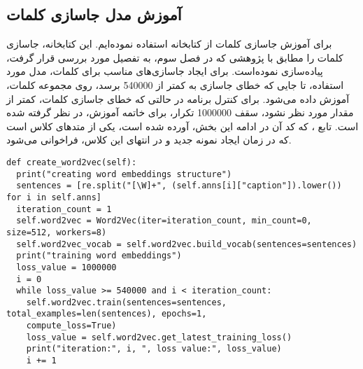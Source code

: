 \subsection*{آموزش مدل جاسازی کلمات}
برای آموزش جاسازی کلمات از کتابخانه  استفاده نموده‌ایم. این کتابخانه، جاسازی کلمات را مطابق با پژوهشی که در فصل سوم، به تفصیل مورد بررسی قرار گرفت، پیاده‌سازی نموده‌است. برای ایجاد جاسازی‌های مناسب برای کلمات، مدل مورد استفاده، تا جایی که خطای جاسازی به کمتر از 540000 برسد، روی مجموعه کلمات، آموزش داده می‌شود. برای کنترل برنامه در حالتی که خطای جاسازی کلمات، کمتر از مقدار مورد نظر نشود، سقف 1000000 تکرار، برای خاتمه آموزش، در نظر گرفته شده است. تابع ، که کد آن در ادامه این بخش، آورده شده است، یکی از متدهای کلاس  است که در زمان ایجاد نمونه جدید و در انتهای  این کلاس، فراخوانی می‌شود.
\begin{latin}
\begin{verbatim}
def create_word2vec(self):
  print("creating word embeddings structure")
  sentences = [re.split("[\W]+", (self.anns[i]["caption"]).lower()) for i in self.anns]
  iteration_count = 1
  self.word2vec = Word2Vec(iter=iteration_count, min_count=0, size=512, workers=8)
  self.word2vec_vocab = self.word2vec.build_vocab(sentences=sentences)
  print("training word embeddings")
  loss_value = 1000000
  i = 0
  while loss_value >= 540000 and i < iteration_count:
    self.word2vec.train(sentences=sentences, total_examples=len(sentences), epochs=1,
    compute_loss=True)
    loss_value = self.word2vec.get_latest_training_loss()
    print("iteration:", i, ", loss value:", loss_value)
    i += 1
\end{verbatim}
\end{latin}